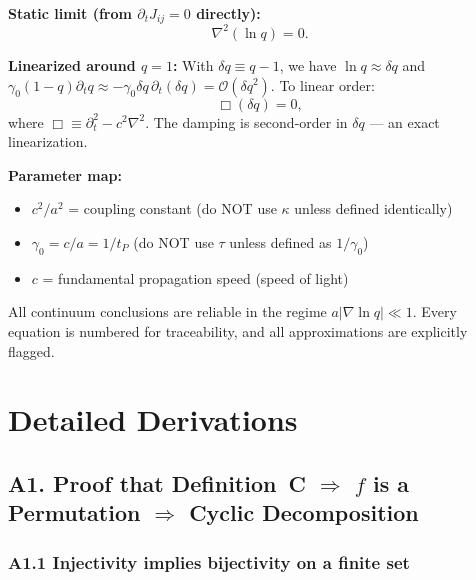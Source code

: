 \documentclass[reprint]{revtex4-2}
\begin{document}
\textbf{Static limit (from $\partial_t J_{ij}=0$ directly):}
\begin{equation}
\boxed{\nabla^2(\ln q) = 0}.
\label{eq:static_limit}
\end{equation}

\textbf{Linearized around $q=1$:} With $\delta q \equiv q-1$, we have $\ln q \approx \delta q$ and $\gamma_0(1-q)\partial_t q \approx -\gamma_0\delta q\,\partial_t(\delta q) = \mathcal{O}(\delta q^2)$. To linear order:
\begin{equation}
\boxed{\Box(\delta q) = 0},
\label{eq:linearized_exact}
\end{equation}
where $\Box \equiv \partial_t^2 - c^2\nabla^2$. The damping is second-order in $\delta q$ --- an exact linearization.

\textbf{Parameter map:}
\begin{itemize}
\item $c^2/a^2$ = coupling constant (do NOT use $\kappa$ unless defined identically)
\item $\gamma_0 = c/a = 1/t_P$ (do NOT use $\tau$ unless defined as $1/\gamma_0$)
\item $c$ = fundamental propagation speed (speed of light)
\end{itemize}

All continuum conclusions are reliable in the regime $a|\nabla\ln q| \ll 1$. Every equation is numbered for traceability, and all approximations are explicitly flagged.

\section{Detailed Derivations}

\subsection{A1. Proof that Definition~C $\Rightarrow$ $f$ is a Permutation $\Rightarrow$ Cyclic Decomposition}

\subsubsection{A1.1 Injectivity implies bijectivity on a finite set}
\end{document}
